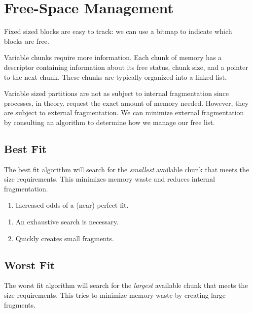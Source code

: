 \documentclass{report}
\begin{document}
\section{Free-Space Management}
Fixed sized blocks are easy to track: we can use a bitmap to indicate which blocks are free.

Variable chunks require more information. Each chunk of memory has a descriptor containing
information about its free status, chunk size, and a pointer to the next chunk. These chunks are
typically organized into a linked list.

Variable sized partitions are not as subject to internal fragmentation since processes, in theory,
request the exact amount of memory needed. However, they are subject to external fragmentation. We
can minimize external fragmentation by consulting an algorithm to determine how we manage our free
list.


\subsection{Best Fit}
The best fit algorithm will search for the \textit{smallest} available chunk that meets the size
requirements. This minimizes memory waste and reduces internal fragmentation.

\begin{tcbraster}[raster columns=2, raster equal height, raster force size=false]
  \begin{tcolorbox}[colback=green!5!white,colframe=black!75!green,title=Advantages]
    \begin{enumerate}[label=\textit{(\roman*)}]
    \item Increased odds of a (near) perfect fit.
    \end{enumerate}
  \end{tcolorbox}
  \begin{tcolorbox}[colback=red!5!white,colframe=black!40!red,title=Disadvantages]
    \begin{enumerate}[label=\textit{(\roman*)}]
    \item An exhaustive search is necessary.
    \item Quickly creates small fragments.
    \end{enumerate}
  \end{tcolorbox}
\end{tcbraster}


\subsection{Worst Fit}
The worst fit algorithm will search for the \textit{largest} available chunk that meets the size
requirements. This tries to minimize memory waste by creating large fragments.
\end{document}
